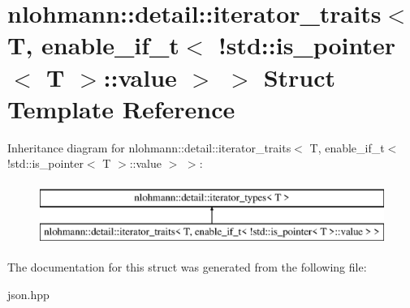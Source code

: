 \hypertarget{structnlohmann_1_1detail_1_1iterator__traits_3_01T_00_01enable__if__t_3_01_9std_1_1is__pointer_3_01T_01_4_1_1value_01_4_01_4}{}\section{nlohmann\+:\+:detail\+:\+:iterator\+\_\+traits$<$ T, enable\+\_\+if\+\_\+t$<$ !std\+:\+:is\+\_\+pointer$<$ T $>$\+:\+:value $>$ $>$ Struct Template Reference}
\label{structnlohmann_1_1detail_1_1iterator__traits_3_01T_00_01enable__if__t_3_01_9std_1_1is__pointer_3_01T_01_4_1_1value_01_4_01_4}
Inheritance diagram for nlohmann\+:\+:detail\+:\+:iterator\+\_\+traits$<$ T, enable\+\_\+if\+\_\+t$<$ !std\+:\+:is\+\_\+pointer$<$ T $>$\+:\+:value $>$ $>$\+:\begin{figure}[H]
\begin{center}
\leavevmode
\includegraphics[height=2.000000cm]{structnlohmann_1_1detail_1_1iterator__traits_3_01T_00_01enable__if__t_3_01_9std_1_1is__pointer_3_01T_01_4_1_1value_01_4_01_4}
\end{center}
\end{figure}


The documentation for this struct was generated from the following file\+:\begin{DoxyCompactItemize}
\item 
json.\+hpp\end{DoxyCompactItemize}
